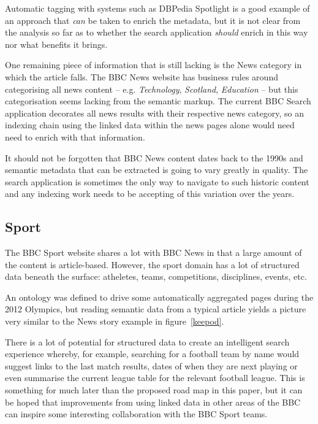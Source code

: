 Automatic tagging with systems such as DBPedia Spotlight is a good
example of an approach that \emph{can} be taken to enrich
the metadata, but it is not clear from the analysis so far as to
whether the search application \emph{should} enrich in this way
nor what benefits it brings.

One remaining piece of information that is still lacking is
the News category in which the article falls. The BBC News
website has business rules around categorising all news
content -- e.g. \emph{Technology}, \emph{Scotland}, \emph{Education}
-- but this categorisation seems lacking from the semantic markup. The
current BBC Search application decorates all news results with
their respective news category, so an indexing chain using
the linked data within the news pages alone would need need
to enrich with that information.

It should not be forgotten that BBC News content dates back to the
1990s and semantic metadata that can be extracted is going
to vary greatly in quality. The search application is sometimes
the only way to navigate to such historic content and any indexing
work needs to be accepting of this variation over the years.

\subsection{Sport}

The BBC Sport website shares a lot with BBC News in that a large
amount of the content is article-based. However, the sport domain
has a lot of structured data beneath the surface: atheletes,
teams, competitions, disciplines, events, etc.

An ontology was defined to drive some automatically aggregated
pages during the 2012 Olympics\cite{rayfield2011bbc}, but reading
semantic data from a typical article yields a picture very similar
to the News story example in figure~\ref{keepod}.

There is a lot of potential for structured data to create an
intelligent search experience whereby, for example, searching
for a football team by name would suggest links to the last
match results, dates of when they are next playing or even
summarise the current league table for the relevant football
league. This is something for much later than the proposed
road map in this paper, but it can be hoped that improvements
from using linked data in other areas of the BBC can inspire
some interesting collaboration with the BBC Sport teams.

